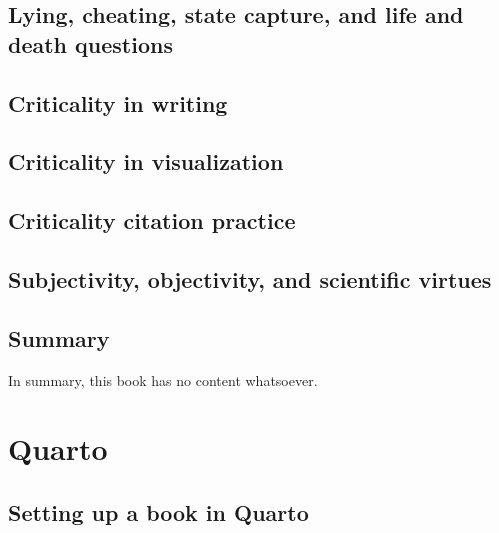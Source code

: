 \documentclass[
  letterpaper,
  DIV=11,
  numbers=noendperiod]{scrreprt}
\begin{document}

\chapter{Lying, cheating, state capture, and life and death
questions}\label{lying-cheating-state-capture-and-life-and-death-questions}


\chapter{Criticality in writing}\label{criticality-in-writing}


\chapter{Criticality in
visualization}\label{criticality-in-visualization}


\chapter{Criticality citation
practice}\label{criticality-citation-practice}


\chapter{Subjectivity, objectivity, and scientific
virtues}\label{subjectivity-objectivity-and-scientific-virtues}


\chapter{Summary}\label{summary}

In summary, this book has no content whatsoever.

\part{Quarto}


\chapter{Setting up a book in Quarto}\label{setting-up-a-book-in-quarto}
\end{document}
